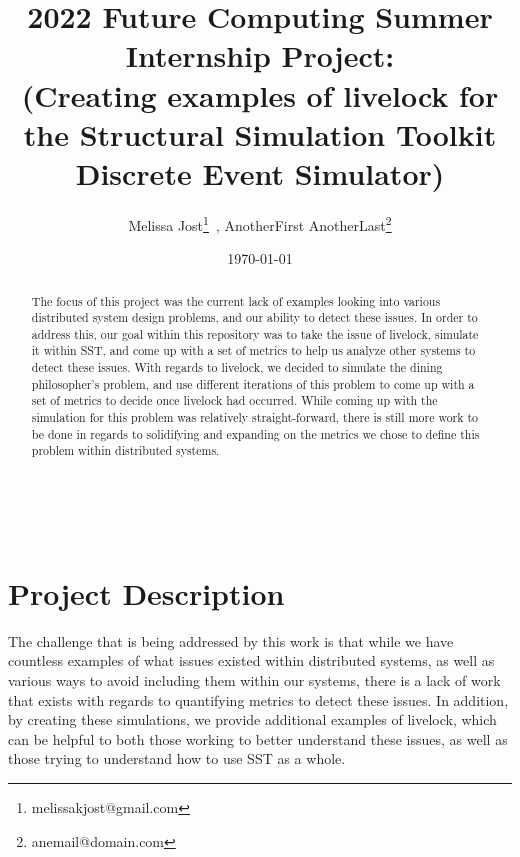 \documentclass{article}
\begin{document}
    \begin{minipage}[h]{\textwidth}
        \title{2022 Future Computing Summer Internship Project:\\(Creating examples of livelock for the Structural Simulation Toolkit Discrete Event Simulator)}
        \author{Melissa Jost\footnote{melissakjost@gmail.com}\ , 
        AnotherFirst AnotherLast\footnote{anemail@domain.com}}
        \date{\today}
            \maketitle
        \begin{abstract}
            The focus of this project was the current lack of examples looking into various distributed system
            design problems, and our ability to detect these issues.  In order to address this, our goal within this 
            repository was to take the issue of livelock, simulate it within SST, and come up with a set of metrics to 
            help us analyze other systems to detect these issues.  With regards to livelock, we decided to simulate the 
            dining philosopher's problem, and use different iterations of this problem to come up with a set of metrics 
            to decide once livelock had occurred.  While coming up with the simulation for this problem was relatively 
            straight-forward, there is still more work to be done in regards to solidifying and expanding on the metrics 
            we chose to define this problem within distributed systems. 
        \end{abstract}
    \end{minipage}

\ \\


\section{Project Description} %

The challenge that is being addressed by this work is that while we have countless examples of 
what issues existed within distributed systems, as well as various ways to avoid including them 
within our systems, there is a lack of work that exists with regards to quantifying metrics to 
detect these issues.  In addition, by creating these simulations, we provide additional examples 
of livelock, which can be helpful to both those working to better understand these issues, as well 
as those trying to understand how to use SST as a whole.
\end{document}

